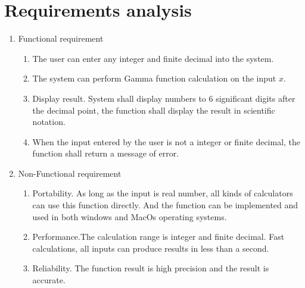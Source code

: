\documentclass[12pt]{extarticle}
\newcommand{\<}{\langle}
\renewcommand{\>}{\rangle}
\theoremstyle{definition}
\begin{document}
\section{Requirements analysis}
\begin{enumerate}[\text{2.}1]
\item Functional requirement
\begin{enumerate}[\text{2.1.}1]
\item The user can enter any integer and finite decimal into the system.
\item The system can perform Gamma function calculation on the input $x$.
\item Display result. System shall display numbers to 6 significant digits after the decimal point, the function shall display the result in scientific notation.
\item When the input entered by the user is not a integer or finite decimal, the function shall return a message of error.
\end{enumerate}
\item Non-Functional requirement
\begin{enumerate}[\text{2.2.}1]
\item Portability. As long as the input is real number, all kinds of calculators can use this function directly. And the function can be implemented and used in both windows and MacOs operating systems.
\item Performance.The calculation range is integer and finite decimal. Fast calculations, all inputs can produce results in less than a second.
\item Reliability. The function result is high precision and the result is accurate.
\end{enumerate}

\end{enumerate}
\end{document}

